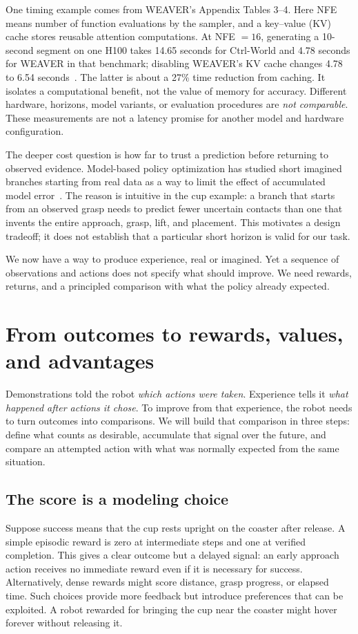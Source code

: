 One timing example comes from WEAVER's Appendix Tables 3--4. Here NFE means number of function evaluations by the sampler, and a key--value (KV) cache stores reusable attention computations. At NFE $=16$, generating a 10-second segment on one H100 takes 14.65 seconds for Ctrl-World and 4.78 seconds for WEAVER in that benchmark; disabling WEAVER's KV cache changes 4.78 to 6.54 seconds~\citep{weaver}. The latter is about a 27\% time reduction from caching. It isolates a computational benefit, not the value of memory for accuracy. Different hardware, horizons, model variants, or evaluation procedures are \emph{not comparable}. These measurements are not a latency promise for another model and hardware configuration.

The deeper cost question is how far to trust a prediction before returning to observed evidence. Model-based policy optimization has studied short imagined branches starting from real data as a way to limit the effect of accumulated model error~\citep{mbpo}. The reason is intuitive in the cup example: a branch that starts from an observed grasp needs to predict fewer uncertain contacts than one that invents the entire approach, grasp, lift, and placement. This motivates a design tradeoff; it does not establish that a particular short horizon is valid for our task.

We now have a way to produce experience, real or imagined. Yet a sequence of observations and actions does not specify what should improve. We need rewards, returns, and a principled comparison with what the policy already expected.

\section{From outcomes to rewards, values, and advantages}

\label{sec:experience-signals}
Demonstrations told the robot \emph{which actions were taken}. Experience tells it \emph{what happened after actions it chose}. To improve from that experience, the robot needs to turn outcomes into comparisons. We will build that comparison in three steps: define what counts as desirable, accumulate that signal over the future, and compare an attempted action with what was normally expected from the same situation.
\subsection{The score is a modeling choice}
Suppose success means that the cup rests upright on the coaster after release. A simple episodic reward is zero at intermediate steps and one at verified completion. This gives a clear outcome but a delayed signal: an early approach action receives no immediate reward even if it is necessary for success. Alternatively, dense rewards might score distance, grasp progress, or elapsed time. Such choices provide more feedback but introduce preferences that can be exploited. A robot rewarded for bringing the cup near the coaster might hover forever without releasing it.

